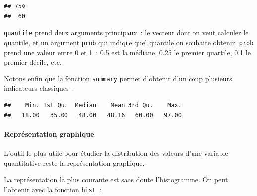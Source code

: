 \documentclass[12pt,]{book}
\newenvironment{Shaded}{\begin{snugshade}}{\end{snugshade}}
\newcommand{\CommentTok}[1]{\textcolor[rgb]{0.37,0.37,0.37}{\textit{#1}}}
\newcommand{\DataTypeTok}[1]{\textcolor[rgb]{0.27,0.27,0.27}{#1}}
\newcommand{\FloatTok}[1]{\textcolor[rgb]{0.06,0.06,0.06}{#1}}
\newcommand{\KeywordTok}[1]{\textcolor[rgb]{0.27,0.27,0.27}{\textbf{#1}}}
\newcommand{\NormalTok}[1]{#1}
\newcommand{\OperatorTok}[1]{\textcolor[rgb]{0.43,0.43,0.43}{\textbf{#1}}}
\let\oldparagraph\paragraph
\renewcommand{\paragraph}[1]{\oldparagraph{#1}\mbox{}}
\begin{document}
\begin{Shaded}
\end{Shaded}

\begin{verbatim}
## 75% 
##  60
\end{verbatim}

\texttt{quantile} prend deux arguments principaux~: le vecteur dont on veut calculer le quantile, et un argument \texttt{prob} qui indique quel quantile on souhaite obtenir. \texttt{prob} prend une valeur entre 0 et 1~: 0.5 est la médiane, 0.25 le premier quartile, 0.1 le premier décile, etc.

Notons enfin que la fonction \texttt{summary} permet d'obtenir d'un coup plusieurs indicateurs classiques~:

\begin{Shaded}
\end{Shaded}

\begin{verbatim}
##    Min. 1st Qu.  Median    Mean 3rd Qu.    Max. 
##   18.00   35.00   48.00   48.16   60.00   97.00
\end{verbatim}

\hypertarget{repruxe9sentation-graphique}{%
\paragraph{Représentation graphique}\label{repruxe9sentation-graphique}}

L'outil le plus utile pour étudier la distribution des valeurs d'une variable quantitative reste la représentation graphique.

La représentation la plus courante est sans doute l'histogramme. On peut l'obtenir avec la fonction \texttt{hist}~:

\begin{Shaded}
\end{Shaded}
\end{document}
